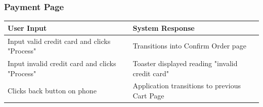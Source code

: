 \documentclass[12pt, titlepage]{article}
\begin{document}
\subsubsection{Payment Page}

\begin{center}
    \begin{tabular}{ | l | p{7cm} |}
    \hline
    User Input & System Response \\ \hline
 	Input valid credit card and clicks "Process" & Transitions into Confirm Order page \\ \hline
    Input invalid credit card and clicks "Process" &  Toaster displayed reading "invalid credit card"\\ \hline
    Clicks back button on phone & Application transitions to previous Cart Page \\
    \hline
    \end{tabular}
\end{center}
\end{document}

